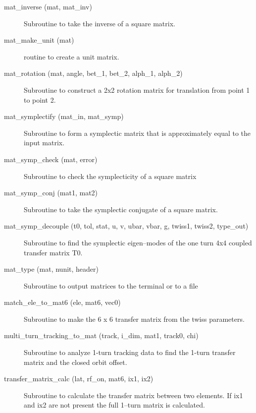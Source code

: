 \begin{description}
\item[mat_inverse (mat, mat_inv)] \Newline
Subroutine to take the inverse of a square matrix. 

\item[mat_make_unit (mat)] \Newline 
     routine to create a unit matrix.

\item[mat_rotation (mat, angle, bet_1, bet_2, alph_1, alph_2)] \Newline 
     Subroutine to construct a 2x2 rotation matrix for translation from
     point 1 to point 2.

\item[mat_symplectify (mat_in, mat_symp)] \Newline
Subroutine to form a symplectic matrix that is approximately equal to the input matrix. 

\item[mat_symp_check (mat, error)] \Newline
Subroutine to check the symplecticity of a square matrix 

\item[mat_symp_conj (mat1, mat2)] \Newline 
Subroutine to take the symplectic conjugate of a square matrix.

\item[mat_symp_decouple (t0, tol, stat, u, v, ubar, vbar, g, twiss1, twiss2, type_out)] \Newline
Subroutine to find the symplectic eigen--modes of the one turn 4x4 coupled 
transfer matrix T0. 

\item[mat_type (mat, nunit, header)] \Newline 
     Subroutine to output matrices to the terminal or to a file

\item[match_ele_to_mat6 (ele, mat6, vec0)] \Newline 
Subroutine to make the 6 x 6 transfer matrix from the twiss parameters.

\item[multi_turn_tracking_to_mat (track, i_dim, mat1, track0, chi)] \Newline
Subroutine to analyze 1-turn tracking data to find the 1-turn transfer matrix 
and the closed orbit offset.

\item[transfer_matrix_calc (lat, rf_on, mat6, ix1, ix2)] \Newline
Subroutine to calculate the transfer matrix between two elements. If
ix1 and ix2 are not present the full 1--turn matrix is calculated.


\end{description}

